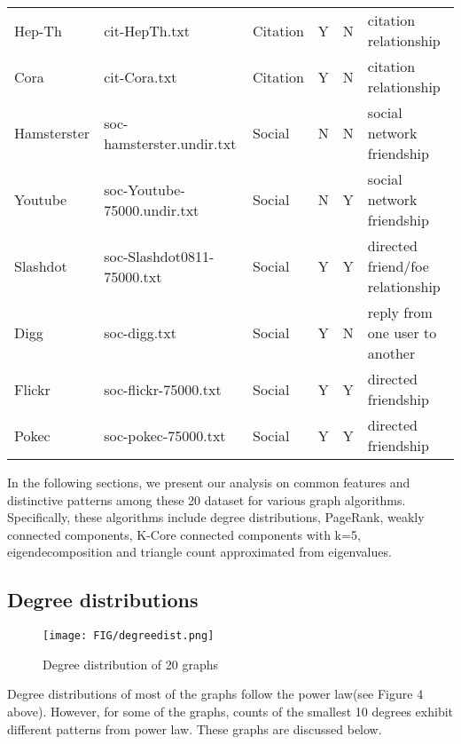 \begin{table}[h]
\begin{tabular}{llllll}
Hep-Th         & cit-HepTh.txt                & Citation      & Y        & N       & citation relationship                  \\
Cora           & cit-Cora.txt                 & Citation      & Y        & N       & citation relationship                  \\
Hamsterster    & soc-hamsterster.undir.txt    & Social        & N        & N       & social network friendship              \\
Youtube        & soc-Youtube-75000.undir.txt  & Social        & N        & Y       & social network friendship              \\
Slashdot       & soc-Slashdot0811-75000.txt   & Social        & Y        & Y       & directed friend/foe relationship       \\
Digg           & soc-digg.txt                 & Social        & Y        & N       & reply from one user to another         \\
Flickr         & soc-flickr-75000.txt         & Social        & Y        & Y       & directed friendship                    \\
Pokec          & soc-pokec-75000.txt          & Social        & Y        & Y       & directed friendship                    \\ \hline
\end{tabular}
\end{table}

In the following sections, we present our analysis on common features and distinctive patterns among these 20 dataset for various graph algorithms. Specifically, these algorithms include degree distributions, PageRank, weakly connected components, K-Core connected components with k=5, eigendecomposition and triangle count approximated from eigenvalues.

\subsection{Degree distributions}
\begin{figure}[H]
\begin{center}
\texttt{[image: FIG/degreedist.png]}
\caption{Degree distribution of 20 graphs}
\end{center}
\end{figure}

\par Degree distributions of most of the graphs follow the power law(see Figure 4 above). However, for some of the graphs, counts of the smallest 10 degrees exhibit different patterns from power law. These graphs are discussed below.

